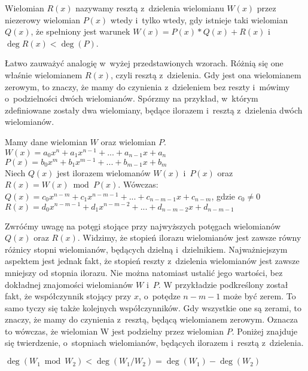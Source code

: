 \begin{definition}
	$ $\\
	Wielomian $R(x)$ nazywamy resztą z~dzielenia wielomianu $W(x)$ przez niezerowy wielomian $P(x)$ wtedy i~tylko wtedy, gdy istnieje taki wielomian $Q(x)$, że spełniony jest warunek $W(x) = P(x) * Q(x) + R(x)$ i~$\deg R(x) < \deg(P)$.
\end{definition}

Łatwo zauważyć analogię w~wyżej przedstawionych wzorach. Różnią się one właśnie wielomianem $R(x)$, czyli resztą z~dzielenia. Gdy jest ona wielomianem zerowym, to znaczy, że mamy do czynienia z~dzieleniem bez reszty i~mówimy o~podzielności dwóch wielomianów. Spórzmy na przykład, w~którym zdefiniowane zostały dwa wielomiany, będące ilorazem i~resztą z~dzielenia dwóch wielomianów.

\begin{example}
	$ $\\
	Mamy dane wielomian $W$ oraz wielomian $P$. \\
	$W(x) = a_0x^n + a_1x^{n-1} + ... + a_{n-1}x + a_n$ \\
	$P(x) = b_0x^m + b_1x^{m-1} + ... + b_{m-1}x + b_m$ \\
	Niech $Q(x)$ jest ilorazem wielomanów $W(x)$ i~$P(x)$ oraz $R(x) = W(x)\bmod P(x)$. Wówczas: \\
	$Q(x) = c_0x^{n-m} + c_1x^{n-m-1} + ... + c_{n-m-1}x + c_{n-m}$, gdzie $c_0\ne 0$ \\
	$R(x) = d_0x^{n-m-1} + d_1x^{n-m-2} + ... + d_{n-m-2}x + d_{n-m-1}$
\end{example}

Zwróćmy uwagę na potęgi stojące przy najwyższych potęgach wielomianów $Q(x)$ oraz $R(x)$. Widzimy, że stopień ilorazu wielomianów jest zawsze równy różnicy stopni wielomianów, będących dzielną i~dzielnikiem. Najważniejszym aspektem jest jednak fakt, że stopień reszty z~dzielenia wielomianów jest zawsze mniejszy od stopnia ilorazu. Nie można natomiast ustalić jego wartości, bez dokładnej znajomości wielomianów $W$ i~$P$. W przykładzie podkreślony został fakt, że współczynnik stojący przy $x$, o~potędze $n-m-1$ może być zerem. To samo tyczy się także kolejnych współczynników. Gdy wszystkie one są zerami, to znaczy, że mamy do czynienia z~resztą, będącą wielomianem zerowym. Oznacza to wówczas, że wielomian W jest podzielny przez wielomian $P$. Poniżej znajduje się twierdzenie, o~stopniach wielomianów, będących ilorazem i~resztą z~dzielenia.

\begin{theorem}
	$ $\\
	$\deg(W_1 \bmod W_2) < \deg(W_1 / W_2) = \deg(W_1) - \deg(W_2)$
\end{theorem}

